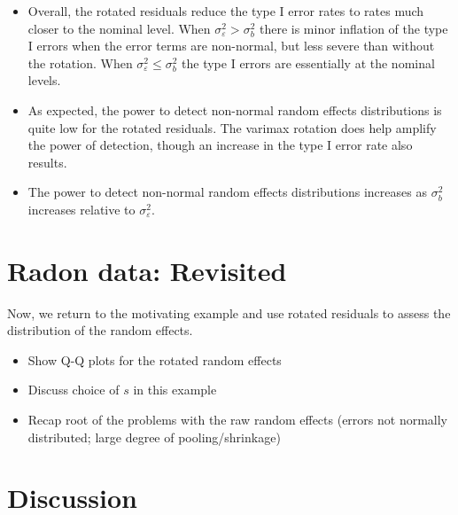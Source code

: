 \documentclass[12pt]{article} %
\begin{document}
\begin{itemize}
\item Overall, the rotated residuals reduce the type I error rates to rates much closer to the nominal level. When $\sigma^2_\varepsilon > \sigma^2_b$ there is minor inflation of the type I errors when the error terms are non-normal, but less severe than without the rotation. When $\sigma^2_\varepsilon \leq \sigma^2_b$ the type I errors are essentially at the nominal levels.

\item As expected, the power to detect non-normal random effects distributions is quite low for the rotated residuals. The varimax rotation does help amplify the power of detection, though an increase in the type I error rate also results.

\item The power to detect non-normal random effects distributions increases as $\sigma^2_b$ increases relative to $\sigma^2_\varepsilon$.


\end{itemize}

\section{Radon data: Revisited}\label{sec:radon2}

Now, we return to the motivating example and use rotated residuals to assess the distribution of the random effects.

\begin{itemize}
\item Show Q-Q plots for the rotated random effects
\item Discuss choice of $s$ in this example
\item Recap root of the problems with the raw random effects (errors not normally distributed; large degree of pooling/shrinkage)
\end{itemize}

\section{Discussion}\label{sec:discussion}
\end{document}
